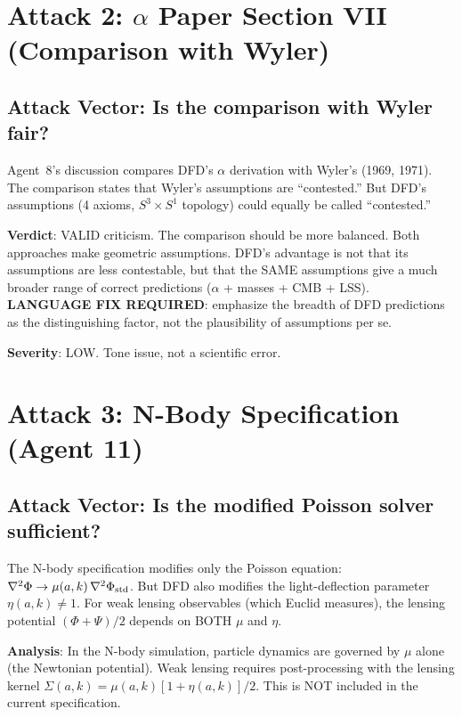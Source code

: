 \documentclass[11pt,a4paper]{article}
\begin{document}
\section{Attack 2: $\alpha$ Paper Section VII (Comparison with Wyler)}

\subsection{Attack Vector: Is the comparison with Wyler fair?}

Agent~8's discussion compares DFD's $\alpha$ derivation with Wyler's (1969, 1971). The comparison states that Wyler's assumptions are ``contested.'' But DFD's assumptions (4 axioms, $S^3 \times S^1$ topology) could equally be called ``contested.''

\textbf{Verdict}: VALID criticism. The comparison should be more balanced. Both approaches make geometric assumptions. DFD's advantage is not that its assumptions are less contestable, but that the SAME assumptions give a much broader range of correct predictions ($\alpha$ + masses + CMB + LSS). \textbf{LANGUAGE FIX REQUIRED}: emphasize the breadth of DFD predictions as the distinguishing factor, not the plausibility of assumptions per se.

\textbf{Severity}: LOW. Tone issue, not a scientific error.

\section{Attack 3: N-Body Specification (Agent 11)}

\subsection{Attack Vector: Is the modified Poisson solver sufficient?}

The N-body specification modifies only the Poisson equation: $\nabla^2\Phi \to \mu(a,k)\,\nabla^2\Phi_{\rm std}$. But DFD also modifies the light-deflection parameter $\eta(a,k) \neq 1$. For weak lensing observables (which Euclid measures), the lensing potential $(\Phi + \Psi)/2$ depends on BOTH $\mu$ and $\eta$.

\textbf{Analysis}: In the N-body simulation, particle dynamics are governed by $\mu$ alone (the Newtonian potential). Weak lensing requires post-processing with the lensing kernel $\Sigma(a,k) = \mu(a,k)[1 + \eta(a,k)]/2$. This is NOT included in the current specification.
\end{document}
